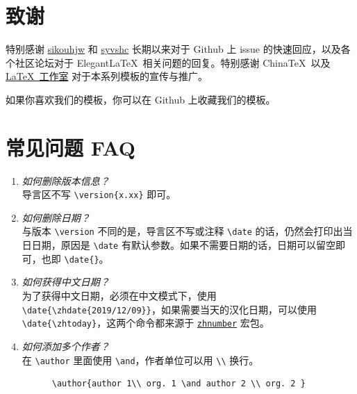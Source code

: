\documentclass[cn,hazy,blue,14pt,screen]{elegantnote}
\begin{document}
\section{致谢}

特别感谢 \href{https://github.com/sikouhjw}{sikouhjw} 和 \href{https://github.com/syvshc}{syvshc}  长期以来对于 Github 上 issue 的快速回应，以及各个社区论坛对于 Elegant\LaTeX\ 相关问题的回复。特别感谢 China\TeX\ 以及 \href{http://www.latexstudio.net/}{\LaTeX\ 工作室} 对于本系列模板的宣传与推广。

如果你喜欢我们的模板，你可以在 Github 上收藏我们的模板。

\section{常见问题 FAQ}

\begin{enumerate}[label=\arabic*).]
  \item \textit{如何删除版本信息？}\\
    导言区不写 \lstinline|\version{x.xx}| 即可。
  \item \textit{如何删除日期？}\\
    与版本 \lstinline{\version} 不同的是，导言区不写或注释 \lstinline{\date} 的话，仍然会打印出当日日期，原因是 \lstinline{\date} 有默认参数。如果不需要日期的话，日期可以留空即可，也即 \lstinline|\date{}|。
  \item \textit{如何获得中文日期？}\\
    为了获得中文日期，必须在中文模式下，使用 \lstinline|\date{\zhdate{2019/12/09}}|，如果需要当天的汉化日期，可以使用 \lstinline|\date{\zhtoday}|，这两个命令都来源于 \href{https://ctan.org/pkg/zhnumber}{\lstinline{zhnumber}} 宏包。
  \item \textit{如何添加多个作者？}\\
    在 \lstinline{\author} 里面使用 \lstinline{\and}，作者单位可以用 \lstinline{\\} 换行。
    \begin{lstlisting}
      \author{author 1\\ org. 1 \and author 2 \\ org. 2 }
    \end{lstlisting}
\end{enumerate}

\end{document}
